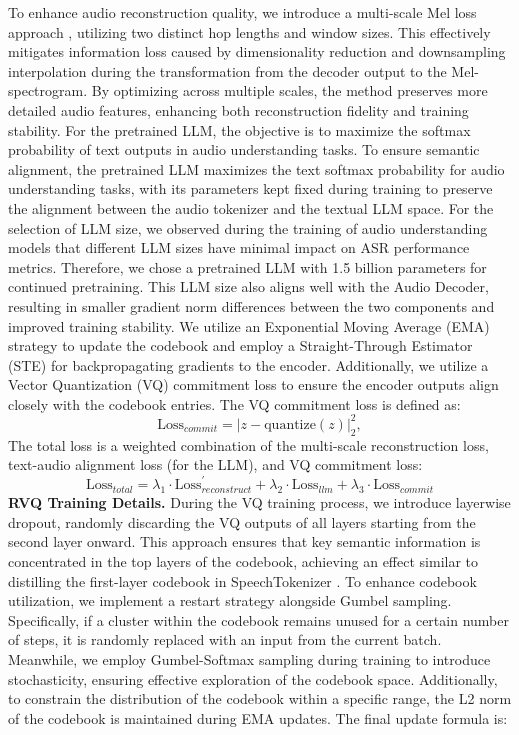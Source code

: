 To enhance audio reconstruction quality, we introduce a multi-scale Mel loss approach \cite{kumar2024high}, utilizing two distinct hop lengths and window sizes. This effectively mitigates information loss caused by dimensionality reduction and downsampling interpolation during the transformation from the decoder output to the Mel-spectrogram. By optimizing across multiple scales, the method preserves more detailed audio features, enhancing both reconstruction fidelity and training stability. For the pretrained LLM, the objective is to maximize the softmax probability of text outputs in audio understanding tasks. To ensure semantic alignment, the pretrained LLM maximizes the text softmax probability for audio understanding tasks, with its parameters kept fixed during training to preserve the alignment between the audio tokenizer and the textual LLM space. For the selection of LLM size, we observed during the training of audio understanding models that different LLM sizes have minimal impact on ASR performance metrics. Therefore, we chose a pretrained LLM with 1.5 billion parameters for continued pretraining. This LLM size also aligns well with the Audio Decoder, resulting in smaller gradient norm differences between the two components and improved training stability. We utilize an Exponential Moving Average (EMA) strategy to update the codebook and employ a Straight-Through Estimator (STE) for backpropagating gradients to the encoder. Additionally, we utilize a Vector Quantization (VQ) commitment loss to ensure the encoder outputs align closely with the codebook entries. The VQ commitment loss is defined as:
\begin{equation}
\text{Loss}_{commit} = | z - \text{quantize}(z) |_2^2,
\end{equation}
The total loss is a weighted combination of the multi-scale reconstruction loss, text-audio alignment loss (for the LLM), and VQ commitment loss:
\begin{equation}
\text{Loss}_{total} = \lambda_1 \cdot \text{Loss}^{'}_{reconstruct} + \lambda_2 \cdot \text{Loss}_{llm} +  \lambda_3 \cdot \text{Loss}_{commit}
\end{equation}
\textbf{RVQ Training Details.}
During the VQ training process, we introduce layerwise dropout, randomly discarding the VQ outputs of all layers starting from the second layer onward. This approach ensures that key semantic information is concentrated in the top layers of the codebook, achieving an effect similar to distilling the first-layer codebook in SpeechTokenizer \cite{zhang2024speechtokenizer}. To enhance codebook utilization, we implement a restart strategy alongside Gumbel sampling. Specifically, if a cluster within the codebook remains unused for a certain number of steps, it is randomly replaced with an input from the current batch. Meanwhile, we employ Gumbel-Softmax sampling during training to introduce stochasticity, ensuring effective exploration of the codebook space.  Additionally, to constrain the distribution of the codebook within a specific range, the L2 norm of the codebook is maintained during EMA updates. The final update formula is:
